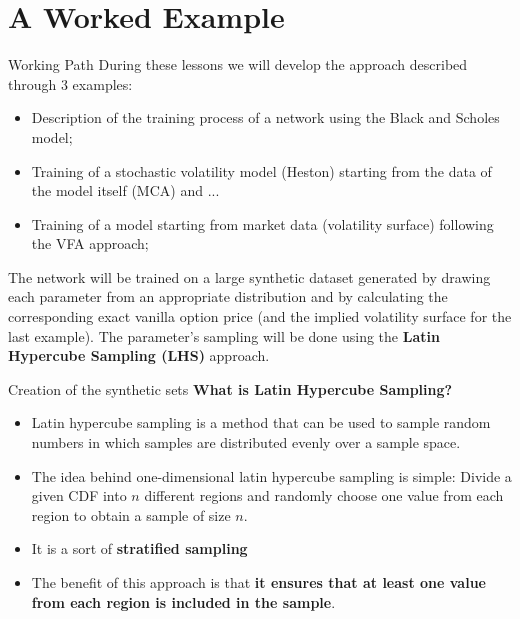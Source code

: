 \documentclass[11pt]{beamer}
\begin{document}
\section{A Worked Example}
\begin{frame}{Working Path}
During these lessons we will develop the approach described through 3 examples: 
	\begin{itemize}
		\item Description of the training process of a network using the Black and Scholes model; 
		\item Training of a stochastic volatility model (Heston) starting from the data of the model itself (MCA) and ...
		\item Training of a model starting from market data (volatility surface) following the VFA approach;
	\end{itemize}
	
The network will be trained on a large synthetic dataset generated by
drawing each parameter from an appropriate distribution and by calculating
the corresponding exact vanilla option price (and the implied volatility surface for the last example).	The parameter's sampling will be done using the \textbf{Latin Hypercube Sampling (LHS)} approach.
\end{frame}
\begin{frame}{Creation of the synthetic sets}
\textbf{What is Latin Hypercube Sampling?}
\begin{itemize}
\item Latin hypercube sampling is a method that can be used to sample random numbers in which samples are distributed evenly over a sample space.

\item The idea behind one-dimensional latin hypercube sampling is simple: Divide a given CDF into $n$ different regions and randomly choose one value from each region to obtain a sample of size $n$.
\item It is a sort of \textbf{stratified sampling}

\item The benefit of this approach is that \textbf{it ensures that at least one value from each region is included in the sample}.
\end{itemize}
\end{frame}
\end{document}

